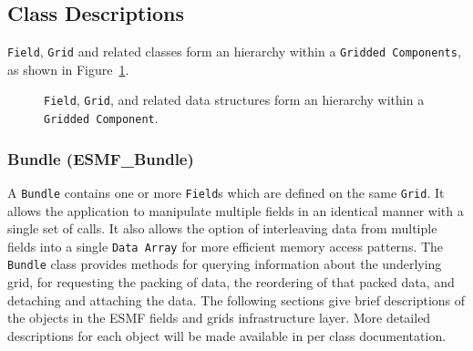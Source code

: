\subsection{Class Descriptions}

{\tt Field}, {\tt Grid} and related classes form an hierarchy within 
a {\tt Gridded Components}, as shown in Figure~\ref{fig:datastruct}.

\begin{figure}
\caption[{Hierarchy of Data Structures}]{{\tt Field}, {\tt Grid}, and 
related data structures form an hierarchy within a {\tt Gridded Component}.}
\label{fig:datastruct}
\end{figure}


\subsubsection{Bundle (ESMF\_Bundle)}
\label{sec:bundle} 
A {\tt Bundle} contains one or more {\tt Field}s which are defined on 
the same {\tt Grid}.  It allows the application to manipulate multiple fields in 
an identical manner with a single set of calls.  It also allows the option 
of interleaving data from multiple fields into a single {\tt Data Array} for 
more efficient memory access patterns.  The {\tt Bundle} class provides methods 
for querying information about the underlying grid, for requesting the 
packing of data, the reordering of that packed data, and detaching and 
attaching the data. The following sections give brief descriptions of the
objects in the ESMF fields and grids infrastructure layer. More detailed descriptions for each object will be made available in per class documentation.

